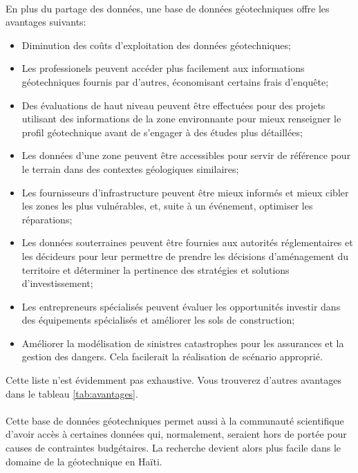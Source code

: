 \paragraph{}
En plus du partage des données, une base de données géotechniques
offre les avantages suivants:
\begin{itemize}
    \item Diminution des coûts d'exploitation des données géotechniques;
    \item Les professionels peuvent accéder plus facilement aux informations géotechniques
    fournis par d'autres, économisant certains frais d'enquête;
    \item Des évaluations de haut niveau peuvent être effectuées pour des
    projets utilisant des informations de la zone environnante pour
    mieux renseigner le profil géotechnique avant de s'engager à des
    études plus détaillées;
    \item Les données d'une zone peuvent être
    accessibles pour servir de référence pour le terrain  dans des contextes géologiques similaires;
    \item Les fournisseurs d'infrastructure peuvent être mieux informés
    et mieux cibler les zones les plus vulnérables, et, suite à un événement, optimiser les réparations;
    \item  Les données souterraines peuvent être fournies aux autorités réglementaires
    et les décideurs pour leur permettre de prendre
    les décisions d'aménagement du territoire et déterminer la pertinence
    des stratégies et solutions d'investissement;
    \item  Les entrepreneurs spécialisés peuvent évaluer les opportunités
    investir dans des équipements spécialisés et améliorer les sols de construction;
    \item Améliorer la modélisation de sinistres catastrophes pour les assurances et
    la gestion des dangers. Cela facilerait la réalisation de scénario approprié.    
\end{itemize}
Cette liste n'est évidemment pas exhaustive. Vous trouverez d'autres avantages dans le tableau \ref{tab:avantages}.

\paragraph{}
Cette base de données géotechniques permet aussi à la communauté
scientifique d'avoir accès à certaines données qui, normalement, seraient 
hors de portée pour causes de contraintes budgétaires. La recherche devient alors plus 
facile dans le domaine de la géotechnique en Haïti.


